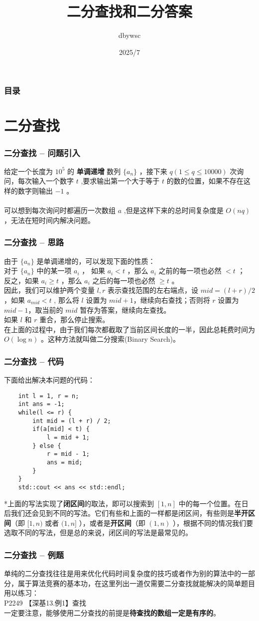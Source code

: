 \documentclass{beamer}
\title{二分查找和二分答案}
\author{dbywsc}
\date{2025/7}
\newcommand{\fdf}[1]{\alert{\textbf{#1}}}
\begin{document}
\frame{\titlepage}
\begin{frame}
	\frametitle{目录}
	\tableofcontents
\end{frame}
\section{二分查找}
\begin{frame}
\frametitle{二分查找 -- 问题引入}
给定一个长度为 $10^5$ 的 \fdf{单调递增} 数列 $\{a_n\}$ ，接下来 $q (1 \leq q \leq 10000)$ 次询问，每次输入一个数字 $t$ ,要求输出第一个大于等于 $t$ 的数的位置，如果不存在这样的数字则输出 $-1$ 。 \\
\\
可以想到每次询问时都遍历一次数组 $a$ ,但是这样下来的总时间复杂度是 $O(nq)$ ，无法在短时间内解决问题。
\end{frame}
\begin{frame}
\frametitle{二分查找 -- 思路}
由于 $\{a_n\}$ 是单调递增的，可以发现下面的性质：\\
对于 $\{a_n\}$ 中的某一项 $a_i$ ， 如果 $a_i < t$ ，那么 $a_i$ 之前的每一项也必然 $< t$ ；\\
反之，如果 $a_i \geq t$ ，那么 $a_i$ 之后的每一项也必然 $\geq t$ 。 	\\
因此，我们可以维护两个变量 $l, r$ 表示查找范围的左右端点，设 $mid = (l + r) / 2$ ，如果 $a_{mid} < t$ , 那么将 $l$ 设置为 $mid + 1$，继续向右查找；否则将 $r$ 设置为 $mid - 1$，取当前的 $mid$ 暂存为答案，继续向左查找。 	\\ 
如果 $l$ 和 $r$ 重合，那么停止搜索。\\ 
在上面的过程中，由于我们每次都截取了当前区间长度的一半，因此总耗费时间为 $O(\log n)$ 。这种方法就叫做二分搜索(Binary Search)。
\end{frame}
\begin{frame}[fragile]
\frametitle{二分查找 -- 代码}
下面给出解决本问题的代码：
\begin{onlyenv}
\begin{verbatim}
    int l = 1, r = n;
    int ans = -1;
    while(l <= r) {
        int mid = (l + r) / 2;
        if(a[mid] < t) {
            l = mid + 1;
        } else {
            r = mid - 1;
            ans = mid;
        }
    }
    std::cout << ans << std::endl;
\end{verbatim}
\end{onlyenv}
*上面的写法实现了\fdf{闭区间}的取法，即可以搜索到 $[1, n]$ 中的每一个位置。在日后我们还会见到不同的写法。它们有些和上面的一样都是闭区间，有些则是\fdf{半开区间}（即 $[1, n)$ 或者 $(1, n]$ ），或者是\fdf{开区间}（即 $(1, n)$ ），根据不同的情况我们要选取不同的写法，但是总的来说，闭区间的写法是最常见的。
\end{frame}
\begin{frame}
\frametitle{二分查找 -- 例题}
单纯的二分查找往往是用来优化代码时间复杂度的技巧或者作为别的算法中的一部分，属于算法竞赛的基本功，在这里列出一道仅需要二分查找就能解决的简单题目用以练习：\\
P2249 【深基13.例1】查找 \\ 
一定要注意，能够使用二分查找的前提是\fdf{待查找的数组一定是有序的}。
\end{frame}
\end{document}
